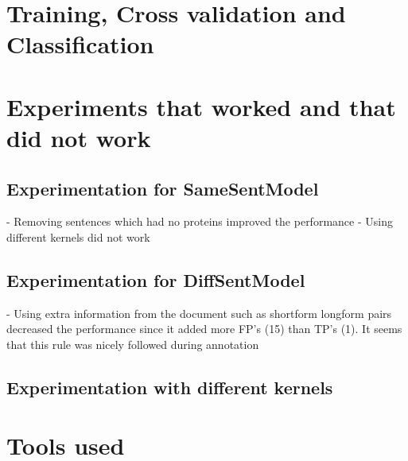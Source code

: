 %
%
%

\section{Training, Cross validation and Classification}\label{sec:training}

\section{Experiments that worked and that did not work}\label{sec:experiments}

\subsection{Experimentation for SameSentModel}

- Removing sentences which had no proteins improved the performance
- Using different kernels did not work

\subsection{Experimentation for DiffSentModel}

- Using extra information from the document such as shortform longform pairs decreased the performance since it added more FP's (15) than TP's (1). It seems that this rule was nicely followed during annotation

\subsection{Experimentation with different kernels}

\section{Tools used}\label{sec:tools}
